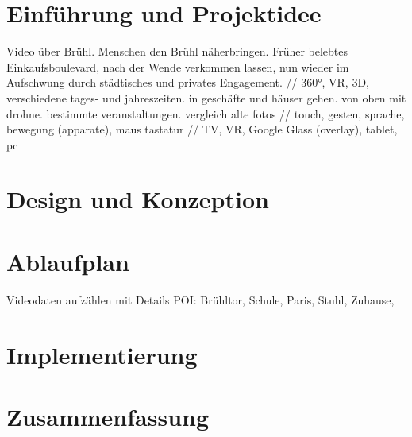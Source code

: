 \chapter{Einführung und Projektidee}
Video über Brühl. Menschen den Brühl näherbringen. Früher belebtes Einkaufsboulevard, nach der Wende verkommen lassen, nun wieder im Aufschwung durch städtisches und privates Engagement. // 360°, VR, 3D, verschiedene tages- und jahreszeiten. in geschäfte und häuser gehen. von oben mit drohne. bestimmte veranstaltungen. vergleich alte fotos // touch, gesten, sprache, bewegung (apparate), maus tastatur // TV, VR, Google Glass (overlay), tablet, pc
\chapter{Design und Konzeption}
\chapter{Ablaufplan}
Videodaten aufzählen mit Details
POI: Brühltor, Schule, Paris, Stuhl, Zuhause, 
\chapter{Implementierung}
\chapter{Zusammenfassung}




